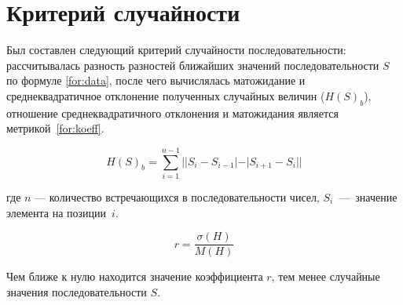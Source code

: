 \section{Критерий случайности}

Был составлен следующий критерий случайности последовательности: рассчитывалась разность разностей ближайших значений  последовательности $S$ по формуле \ref{for:data}, после чего вычислялась матожидание и среднеквадратичное отклонение полученных случайных величин ($H(S)_b$), отношение среднеквадратичного отклонения и матожидания является метрикой~\ref{for:koeff}.

\begin{equation}
	\label{for:data}
	H(S)_{b} = \sum_{i=1}^{n-1} ||S_{i} - S_{i - 1}| - |S_{i+1} - S_{i}||
\end{equation}

где $n$ --- количество встречающихся в последовательности чисел, $S_{i}$~---~значение элемента на позиции~$i$. 

\begin{equation}
	\label{for:koeff}
	r = \frac{\sigma(H)}{M(H)} 
\end{equation}




Чем ближе к нулю находится значение коэффициента $r$, тем менее случайные значения последовательности $S$.


